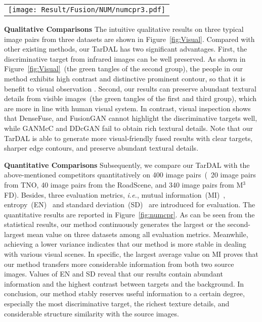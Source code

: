 \documentclass[10pt,twocolumn,letterpaper]{article}
\begin{document}
\begin{figure*}[!htb]
	\centering
	\setlength{\tabcolsep}{1pt} 
	\begin{tabular}{c}		
		\texttt{[image: Result/Fusion/NUM/numcpr3.pdf]}	
	\end{tabular}
	\vspace{-0.3cm}  
	\caption{Quantitative comparisons with seven IVIF methods on TNO, RoadScene and M$^3$FD datasets, respectively. The x-axis represents metrics and the y-axis are the values.~($*$). In the boxes, the orange lines and the green tangles denote medium and mean values. }
	\label{fig:numcpr}
\end{figure*} 
\noindent\textbf{Qualitative Comparisons} The intuitive qualitative results on three typical image pairs from three datasets are shown in Figure~\ref{fig:Visual}. Compared with other existing methods, our TarDAL has two significant advantages. First, the discriminative target from infrared images can be well preserved. As shown in Figure~\ref{fig:Visual}~(the green tangles of the second group), the people in our method exhibits high contrast and distinctive prominent contour, so that it is benefit to visual observation . Second, our results can preserve abundant textural details from visible images~(the green tangles of the first and third group), which are more in line with human visual system. In contrast, visual inspection shows that DenseFuse, and FusionGAN cannot highlight the discriminative targets well, while GANMcC and DDcGAN fail to obtain rich textural details. Note that our TarDAL is able to generate more visual-friendly fused results with clear targets, sharper edge contours, and preserve abundant textural details. 

\noindent\textbf{Quantitative Comparisons} Subsequently, we compare our TarDAL with the above-mentioned competitors quantitatively on 400 image pairs~(~20 image pairs from TNO, 40 image pairs from the RoadScene, and 340 image pairs from M$^3$FD). Besides, three evaluation metrics, \emph{i.e.}, mutual information~(MI)~\cite{Qu2002Information}, entropy~(EN)~\cite{Roberts2008Assessment} and standard deviation~(SD)~\cite{aslantas2015new} are introduced for evaluation. The quantitative results are reported in Figure~\ref{fig:numcpr}. As can be seen from the statistical results, our method continuously generates the largest or the second-largest mean value on three datasets among all evaluation metrics. Meanwhile, achieving a lower variance indicates that our method is more stable in dealing with various visual scenes. In specific, the largest average value on MI proves that our method transfers more considerable information from both two source images. Values of EN and SD reveal that our results contain abundant information and the highest contrast between targets and the background. In conclusion, our method stably reserves useful information to a certain degree, especially the most discriminative target, the richest texture details, and considerable structure similarity with the source images.
\end{document}
